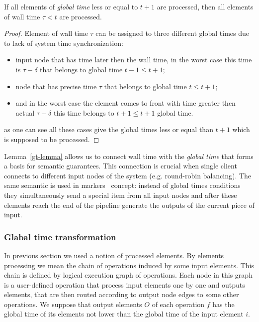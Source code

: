 \begin{lemma}
\label{gt-lemma}
If all elements of \textit{global time} less or equal to $t + 1$ are processed, then all elements of wall time $\tau < t$ are processed.
\end{lemma}
\begin{proof}
Element of wall time $\tau$ can be assigned to three different global times due to lack of system time synchronization:
\begin{itemize}
    \item input node that has time later then the wall time, in the worst case this time is $\tau - \delta$ that belongs to global time $t - 1 \le t + 1$;
    \item node that has precise time $\tau$ that belongs to global time $t \le t + 1$;
    \item and in the worst case the element comes to front with time greater then actual $\tau + \delta$ this time belongs to $t + 1 \le t + 1$ global time.
\end{itemize}
as one can see all these cases give the global times less or equal than $t + 1$ which is supposed to be processed.
\end{proof}

Lemma~\ref{gt-lemma} allows us to connect wall time with the \textit{global time} that forms a basis for semantic guarantees. This connection is crucial when single client connects to different input nodes of the system (e.g. round-robin balancing). The same semantic is used in markers~\cite{Carbone:2017:SMA:3137765.3137777} concept: instead of global times conditions they simultaneously send a special item from all input nodes and after these elements reach the end of the pipeline generate the outputs of the current piece of input.

\subsubsection{Glabal time transformation}

In previous section we used a notion of processed elements. By elements processing we mean the chain of operations induced by some input elements. This chain is defined by logical execution graph of operations. Each node in this graph is a user-defined operation that process input elements one by one and outputs elements, that are then routed according to output node edges to some other operations. We suppose that output elements $O$ of each operation $f$ has the global time of its elements not lower than the global time of the input element $i$.

